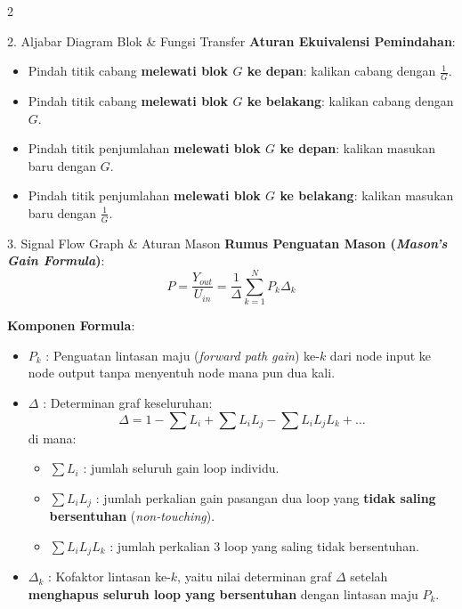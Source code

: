 \documentclass[10pt,a4paper]{article}
\begin{document}
\begin{multicols*}{2}
\begin{rumusbox}{2. Aljabar Diagram Blok \& Fungsi Transfer}
\textbf{Aturan Ekuivalensi Pemindahan}:
\begin{itemize}\setlength\itemsep{1pt}
    \item Pindah titik cabang \textbf{melewati blok $G$ ke depan}: kalikan cabang dengan $\frac{1}{G}$.
    \item Pindah titik cabang \textbf{melewati blok $G$ ke belakang}: kalikan cabang dengan $G$.
    \item Pindah titik penjumlahan \textbf{melewati blok $G$ ke depan}: kalikan masukan baru dengan $G$.
    \item Pindah titik penjumlahan \textbf{melewati blok $G$ ke belakang}: kalikan masukan baru dengan $\frac{1}{G}$.
\end{itemize}
\end{rumusbox}

\begin{rumusbox}{3. Signal Flow Graph \& Aturan Mason}
\textbf{Rumus Penguatan Mason (\textit{Mason's Gain Formula})}:
$$P = \frac{Y_{out}}{U_{in}} = \frac{1}{\Delta} \sum_{k=1}^N P_k \Delta_k$$

\textbf{Komponen Formula}:
\begin{itemize}\setlength\itemsep{2pt}
    \item $P_k$ : Penguatan lintasan maju (\textit{forward path gain}) ke-$k$ dari node input ke node output tanpa menyentuh node mana pun dua kali.
    \item $\Delta$ : Determinan graf keseluruhan:
    $$\Delta = 1 - \sum L_i + \sum L_i L_j - \sum L_i L_j L_k + \dots$$
    di mana:
    \begin{itemize}\setlength\itemsep{1pt}
        \item $\sum L_i$ : jumlah seluruh gain loop individu.
        \item $\sum L_i L_j$ : jumlah perkalian gain pasangan dua loop yang \textbf{tidak saling bersentuhan} (\textit{non-touching}).
        \item $\sum L_i L_j L_k$ : jumlah perkalian 3 loop yang saling tidak bersentuhan.
    \end{itemize}
    \item $\Delta_k$ : Kofaktor lintasan ke-$k$, yaitu nilai determinan graf $\Delta$ setelah \textbf{menghapus seluruh loop yang bersentuhan} dengan lintasan maju $P_k$.
\end{itemize}
\end{rumusbox}


\end{multicols*}
\end{document}
